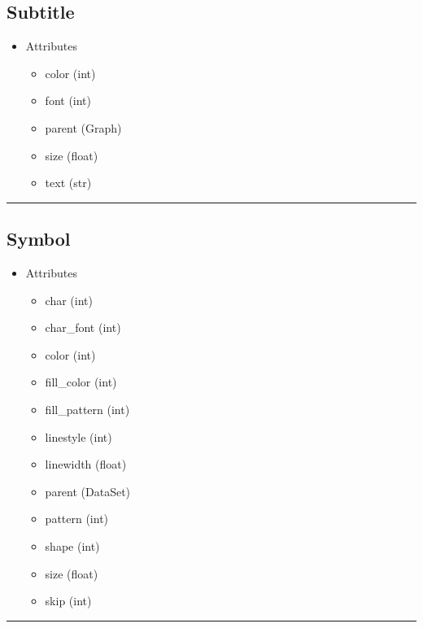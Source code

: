 \documentclass[10pt]{article}
\begin{document}
\begin{multicols}{4}
\subsection*{\footnotesize Subtitle}
\begin{itemize}
\item Attributes
\begin{itemize}
\item color (int)
\item font (int)
\item parent (Graph)
\item size (float)
\item text (str)
\end{itemize}
\end{itemize}
\vspace{0.5em}
\hrule
\vspace{0.1em}
\subsection*{\footnotesize Symbol}
\begin{itemize}
\item Attributes
\begin{itemize}
\item char (int)
\item char\_font (int)
\item color (int)
\item fill\_color (int)
\item fill\_pattern (int)
\item linestyle (int)
\item linewidth (float)
\item parent (DataSet)
\item pattern (int)
\item shape (int)
\item size (float)
\item skip (int)
\end{itemize}
\end{itemize}
\vspace{0.5em}
\hrule
\vspace{0.1em}

\end{multicols}
\end{document}
